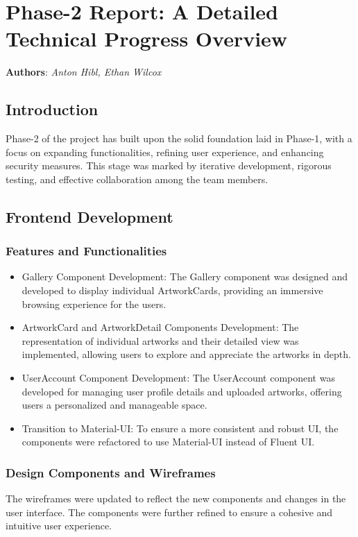 \documentclass[11pt]{article}
\author{Anton Hibl}
\date{\today}
\title{}
\begin{document}
\tableofcontents

\section{Phase-2 Report: A Detailed Technical Progress Overview}
\label{sec:org20aa5eb}
\textbf{Authors}: \emph{Anton Hibl, Ethan Wilcox}

\subsection{Introduction}
\label{sec:org6975e6c}

Phase-2 of the project has built upon the solid foundation laid in Phase-1, with
a focus on expanding functionalities, refining user experience, and enhancing
security measures. This stage was marked by iterative development, rigorous
testing, and effective collaboration among the team members. 

\subsection{Frontend Development}
\label{sec:org1f3a3bd}

\subsubsection{Features and Functionalities}
\label{sec:orge39f501}
\begin{itemize}
\item Gallery Component Development: The Gallery component was designed and
developed to display individual ArtworkCards, providing an immersive
browsing experience for the users.
\item ArtworkCard and ArtworkDetail Components Development: The representation
of individual artworks and their detailed view was implemented, allowing
users to explore and appreciate the artworks in depth.
\item UserAccount Component Development: The UserAccount component was developed
for managing user profile details and uploaded artworks, offering users a
personalized and manageable space.
\item Transition to Material-UI: To ensure a more consistent and robust UI, the
components were refactored to use Material-UI instead of Fluent UI.
\end{itemize}

\subsubsection{Design Components and Wireframes}
\label{sec:org29c7b27}
The wireframes were updated to reflect the new components and changes in the
user interface. The components were further refined to ensure a cohesive and
intuitive user experience. 
\end{document}
